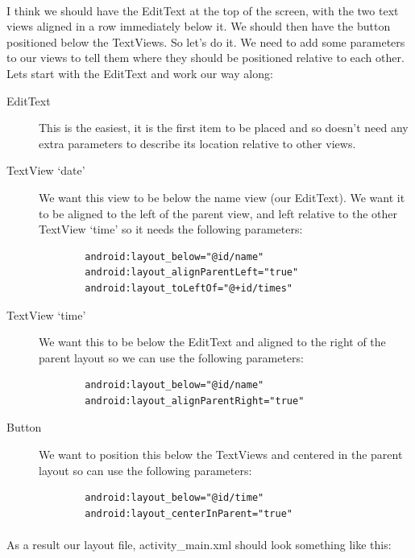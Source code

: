 \documentclass[12pt, a4paper, twoside]{book}
\begin{document}
\paragraph{} I think we should have the EditText at the top of the screen, with the two text views aligned in a row immediately below it. We should then have the button positioned below the TextViews. So let's do it. We need to add some parameters to our views to tell them where they should be positioned relative to each other. Lets start with the EditText and work our way along:

\begin{description}
\item[EditText] This is the easiest, it is the first item to be placed and so doesn't need any extra parameters to describe its location relative to other views.
\item[TextView `date'] We want this view to be below the name view (our EditText). We want it to be aligned to the left of the parent view, and left relative to the other TextView `time' so it needs the following parameters:
    \begin{lstlisting}
        android:layout_below="@id/name"
        android:layout_alignParentLeft="true"
        android:layout_toLeftOf="@+id/times"
    \end{lstlisting}
\item[TextView `time'] We want this to be below the EditText and aligned to the right of the parent layout so we can use the following parameters:
    \begin{lstlisting}
        android:layout_below="@id/name"
        android:layout_alignParentRight="true"
    \end{lstlisting}
\item[Button] We want to position this below the TextViews and centered in the parent layout so can use the following parameters:
    \begin{lstlisting}
        android:layout_below="@id/time"
        android:layout_centerInParent="true"
    \end{lstlisting}
\end{description}

\paragraph{} As a result our layout file, activity\_main.xml should look something like this:
\end{document}
